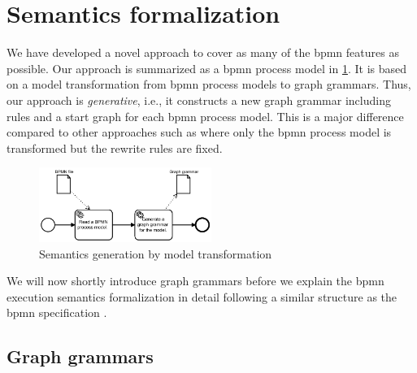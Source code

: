\documentclass[adraft, copyright, creativecommons]{eptcs} %
\begin{document}
\section{Semantics formalization}
We have developed a novel approach to cover as many of the \gls*{bpmn} features as possible.
Our approach is summarized as a \gls*{bpmn} process model in \cref{fig:approach}.
It is based on a model transformation from \gls*{bpmn} process models to graph grammars.
Thus, our approach is \textit{generative}, i.e., it constructs a new graph grammar including rules and a start graph for each \gls*{bpmn} process model.
This is a major difference compared to other approaches such as \cite{corradiniFormalApproachAnalysis2021, vangorpVisualTokenbasedFormalization2013} where only the \gls*{bpmn} process model is transformed but the rewrite rules are fixed.
\begin{figure}[h]
    \centering
    \includegraphics[width=0.5\textwidth]{images/approach-first-part.pdf}
    \caption{Semantics generation by model transformation}
    \label{fig:approach}
\end{figure}

We will now shortly introduce graph grammars before we explain the \gls*{bpmn} execution semantics formalization in detail following a similar structure as the \gls*{bpmn} specification \cite[Chapter 13]{objectmanagementgroupBusinessProcessModel2013}.

\subsection{Graph grammars}
\end{document}
